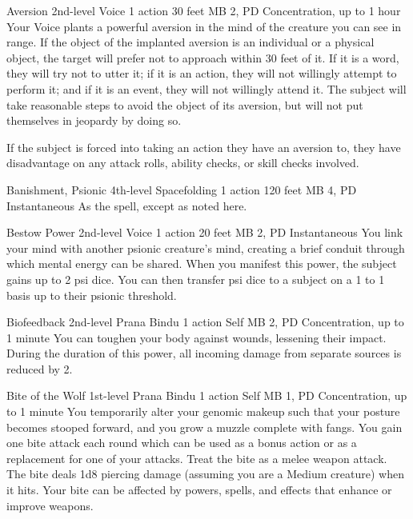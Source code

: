 \DndPowerHeader%
  {Aversion}
  {2nd-level Voice}
  {1 action}
  {30 feet}
  {MB 2, PD \lvltwo}
  {Concentration, up to 1 hour}
Your Voice plants a powerful aversion in the mind of the creature
you can see in range.
If the object of the implanted aversion is an individual
or a physical object,
the target will prefer not to approach within 30 feet of it.
If it is a word,
they will try not to utter it;
if it is an action,
they will not willingly attempt to perform it;
and if it is an event,
they will not willingly attend it.
The subject will take reasonable steps to avoid the object of its aversion,
but will not put themselves in jeopardy by doing so.

If the subject is forced into taking an action they have an aversion to,
they have disadvantage on any attack rolls,
ability checks,
or skill checks involved.

\DndPowerHeader%
  {Banishment, Psionic}
  {4th-level Spacefolding}
  {1 action}
  {120 feet}
  {MB 4, PD \lvlfour}
  {Instantaneous}
As the  spell, except as noted here.

\DndPowerHeader%
  {Bestow Power}
  {2nd-level Voice}
  {1 action}
  {20 feet}
  {MB 2, PD \lvltwo}
  {Instantaneous}
You link your mind with another psionic creature's mind,
creating a brief conduit through which mental energy can be shared.
When you manifest this power,
the subject gains up to 2 psi dice.
You can then transfer psi dice to a subject
on a 1 to 1 basis up to their psionic threshold.

\DndPowerHeader%
  {Biofeedback}
  {2nd-level Prana Bindu}
  {1 action}
  {Self}
  {MB 2, PD \lvltwo}
  {Concentration, up to 1 minute}
    You can toughen your body against wounds,
    lessening their impact.
    During the duration of this power, all incoming damage
    from separate sources is reduced by 2.

\DndPowerHeader%
  {Bite of the Wolf}
  {1st-level Prana Bindu}
  {1 action}
  {Self}
  {MB 1, PD \lvlone}
  {Concentration, up to 1 minute}
  You temporarily alter your genomic makeup
  such that your posture becomes stooped forward,
  and you grow a muzzle complete with fangs.
  You gain one bite attack each round which
  can be used as a bonus action or as a replacement
  for one of your attacks.
  Treat the bite as a melee weapon attack.
  The bite deals 1d8 piercing damage
  (assuming you are a Medium creature)
  when it hits.
  Your bite can be affected by
  powers, spells, and effects
  that enhance or improve weapons.
  
